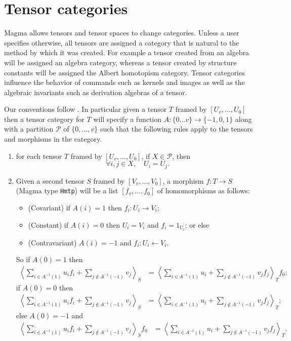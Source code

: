 \chapter{Tensor categories}

Magma allows tensors and tensor spaces to change categories. 
Unless a user specifies otherwise,
all tensors are assigned a category that is natural to the method
by which it was created.
For example a tensor created from an algebra will be assigned an 
algebra category, whereas a tensor created by structure constants
will be assigned the Albert homotopism category.  Tensor categories influence
the behavior of commands such as kernels and images  
as well as the algebraic invariants such as derivation algebras of a tensor.  

Our conventions follow \cite{Wilson:division}.  In particular given
a tensor $T$ framed by $[U_{v},\dots,U_0]$ then a tensor category for
$T$ will specify a function $A:\{0\dots v\}\to \{-1,0,1\}$ along with
a partition $\mathcal{P}$ of $\{0,\dots,v\}$ such that the following 
rules apply to the tensors and morphisms in the category.
\begin{enumerate}
\item for each tensor $T$ framed by $[U_v,\dots,U_0]$, if
$X\in\mathcal{P}$, then 
$$\forall i,j\in X,\quad U_i=U_j.$$

\item Given a second tensor $S$ framed by $[V_v,\dots,V_0]$,
a morphism $f:T\to S$ (Magma type {\tt Hmtp}) will be a list
$[f_v,\dots,f_0]$ of homomorphisms as follows:
\begin{itemize}
\item (Covariant) if $A(i)=1$ then $f_i:U_i\to V_i$;
\item (Constant) if $A(i)=0$ then $U_i=V_i$ and $f_i=1_{U_i}$; or else
\item (Contravariant) $A(i)=-1$ and $f_i:U_i\leftarrow V_i$.
\end{itemize}
So if $A(0)=1$ then
\begin{align*}
	\left\langle \sum_{i\in A^{-1}(1)} u_i f_i
		+\sum_{j\not\in A^{-1}(-1)} v_j\right\rangle_S
		& = \left\langle  \sum_{i\in A^{-1}(1)} u_i 
		+\sum_{j\not\in A^{-1}(-1)} v_j f_j\right\rangle_T f_0;
\end{align*}
if $A(0)=0$ then
\begin{align*}
	\left\langle \sum_{i\in A^{-1}(1)} u_i f_i
		+\sum_{j\not\in A^{-1}(-1)} v_j\right\rangle_S
		& = \left\langle  \sum_{i\in A^{-1}(1)} u_i 
		+\sum_{j\not\in A^{-1}(-1)} v_j f_j\right\rangle_T;
\end{align*}
else $A(0)=-1$ and 
\begin{align*}
	\left\langle \sum_{i\in A^{-1}(1)} u_i f_i
		+\sum_{j\not\in A^{-1}(-1)} v_j\right\rangle_S f_0
		& = \left\langle  \sum_{i\in A^{-1}(1)} u_i 
		+\sum_{j\not\in A^{-1}(-1)} v_j f_j\right\rangle_T.
\end{align*}
\end{enumerate}

